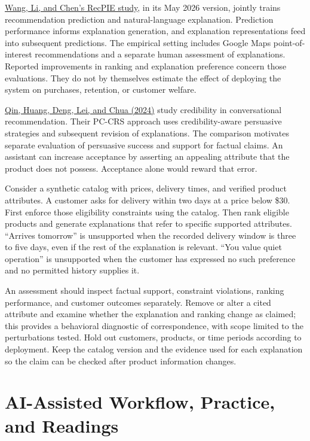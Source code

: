 \href{https://arxiv.org/abs/2502.16759v3}{Wang, Li, and Chen's RecPIE
study}, in its May 2026 version, jointly trains recommendation
prediction and natural-language explanation. Prediction performance
informs explanation generation, and explanation representations feed
into subsequent predictions. The empirical setting includes Google Maps
point-of-interest recommendations and a separate human assessment of
explanations. Reported improvements in ranking and explanation
preference concern those evaluations. They do not by themselves estimate
the effect of deploying the system on purchases, retention, or customer
welfare.

\href{https://aclanthology.org/2024.findings-emnlp.247/}{Qin, Huang,
Deng, Lei, and Chua (2024)} study credibility in conversational
recommendation. Their PC-CRS approach uses credibility-aware persuasive
strategies and subsequent revision of explanations. The comparison
motivates separate evaluation of persuasive success and support for
factual claims. An assistant can increase acceptance by asserting an
appealing attribute that the product does not possess. Acceptance alone
would reward that error.

Consider a synthetic catalog with prices, delivery times, and verified
product attributes. A customer asks for delivery within two days at a
price below \$30. First enforce those eligibility constraints using the
catalog. Then rank eligible products and generate explanations that
refer to specific supported attributes. ``Arrives tomorrow'' is
unsupported when the recorded delivery window is three to five days,
even if the rest of the explanation is relevant. ``You value quiet
operation'' is unsupported when the customer has expressed no such
preference and no permitted history supplies it.

An assessment should inspect factual support, constraint violations,
ranking performance, and customer outcomes separately. Remove or alter a
cited attribute and examine whether the explanation and ranking change
as claimed; this provides a behavioral diagnostic of correspondence,
with scope limited to the perturbations tested. Hold out customers,
products, or time periods according to deployment. Keep the catalog
version and the evidence used for each explanation so the claim can be
checked after product information changes.

\hypertarget{M07-ai-assisted-workflow-practice-and-readings}{%
\section{AI-Assisted Workflow, Practice, and
Readings}\label{M07-ai-assisted-workflow-practice-and-readings}}

